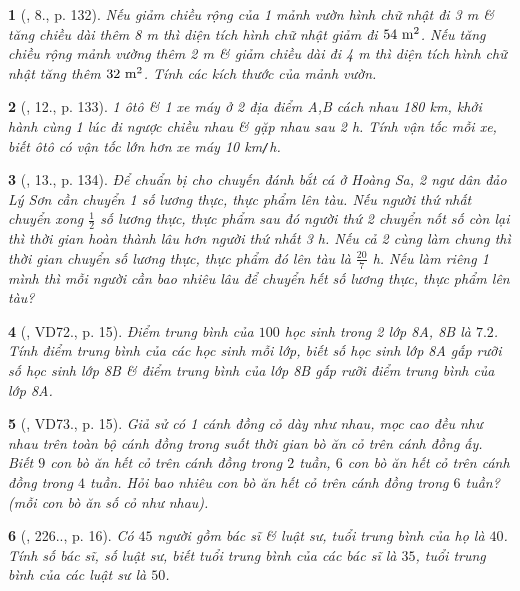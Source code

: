 \documentclass{article}
\newtheorem{baitoan}{}
\begin{document}
\begin{baitoan}[\cite{Kien_dai_so_9}, 8., p. 132]
	Nếu giảm chiều rộng của 1 mảnh vườn hình chữ nhật đi {\rm3 m} \& tăng chiều dài thêm {\rm8 m} thì diện tích hình chữ nhật giảm đi $\rm54\ m^2$. Nếu tăng chiều rộng mảnh vường thêm {\rm2 m} \& giảm chiều dài đi {\rm4 m} thì diện tích hình chữ nhật tăng thêm $\rm32\ m^2$. Tính các kích thước của mảnh vườn.
\end{baitoan}

\begin{baitoan}[\cite{Kien_dai_so_9}, 12., p. 133]
	1 ôtô \& 1 xe máy ở 2 địa điểm A,B cách nhau {\rm180 km}, khởi hành cùng 1 lúc đi ngược chiều nhau \& gặp nhau sau {\rm2 h}. Tính vận tốc mỗi xe, biết ôtô có vận tốc lớn hơn xe máy {\rm10 km{\tt/}h}.
\end{baitoan}

\begin{baitoan}[\cite{Kien_dai_so_9}, 13., p. 134]
	Để chuẩn bị cho chuyến đánh bắt cá ở Hoàng Sa, 2 ngư dân đảo Lý Sơn cần chuyển 1 số lương thực, thực phẩm lên tàu. Nếu người thứ nhất chuyển xong $\frac{1}{2}$ số lương thực, thực phẩm sau đó người thứ 2 chuyển nốt số còn lại thì thời gian hoàn thành lâu hơn người thứ nhất {\rm3 h}. Nếu cả 2 cùng làm chung thì thời gian chuyển số lương thực, thực phẩm đó lên tàu là $\frac{20}{7}$ {\rm h}. Nếu làm riêng 1 mình thì mỗi người cần bao nhiêu lâu để chuyển hết số lương thực, thực phẩm lên tàu?
\end{baitoan}

\begin{baitoan}[\cite{Binh_Toan_9_tap_2}, VD72., p. 15]
	Điểm trung bình của $100$ học sinh trong 2 lớp 8A, 8B là $7.2$. Tính điểm trung bình của các học sinh mỗi lớp, biết số học sinh lớp 8A gấp rưỡi số học sinh lớp 8B \& điểm trung bình của lớp 8B gấp rưỡi điểm trung bình của lớp 8A.
\end{baitoan}

\begin{baitoan}[\cite{Binh_Toan_9_tap_2}, VD73., p. 15]
	Giả sử có 1 cánh đồng cỏ dày như nhau, mọc cao đều như nhau trên toàn bộ cánh đồng trong suốt thời gian bò ăn cỏ trên cánh đồng ấy. Biết $9$ con bò ăn hết cỏ trên cánh đồng trong $2$ tuần, $6$ con bò ăn hết cỏ trên cánh đồng trong $4$ tuần. Hỏi bao nhiêu con bò ăn hết cỏ trên cánh đồng trong $6$ tuần? (mỗi con bò ăn số cỏ như nhau).
\end{baitoan}

\begin{baitoan}[\cite{Binh_Toan_9_tap_2}, 226.., p. 16]
	Có $45$ người gồm bác sĩ \& luật sư, tuổi trung bình của họ là $40$. Tính số bác sĩ, số luật sư, biết tuổi trung bình của các bác sĩ là $35$, tuổi trung bình của các luật sư là $50$.
\end{baitoan}
\end{document}
